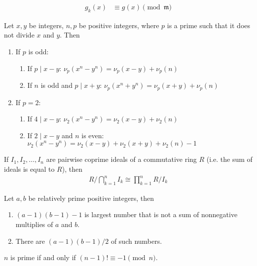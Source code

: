 \documentclass{treatise}
\begin{document}
\begin{shaded}
\begin{lemma}
\begin{align*}
g_k(x) & \equiv g(x) \pmod{\mathfrak{m}}
\end{align*}
\end{lemma}
\begin{lemma}
Let $x, y$ be integers, $n, p$ be positive integers, where $p$ is a prime such that it does not divide $x$ and $y$. Then
\begin{enumerate}
	\item If $p$ is odd:
	\begin{enumerate}
		\item If $p \mid x - y$: $\nu_p (x^n - y^n) = \nu_p (x - y) + \nu_p(n)$
		\item If $n$ is odd and $p \mid x + y$: $\nu_p (x^n + y^n) = \nu_p(x + y) + \nu_p(n)$
	\end{enumerate}
	\item If $p = 2$:
	\begin{enumerate}
		\item If $4 \mid x - y$: $\nu_2 (x^n - y^n) = \nu_2 (x - y) + \nu_2 (n)$
		\item If $2 \mid x - y$ and $n$ is even: $\nu_2 (x^n - y^n) = \nu_2 (x - y) + \nu_2 (x + y) + \nu_2 (n) - 1$
	\end{enumerate}
\end{enumerate}
\end{lemma}
\begin{theorem}
If $I_1, I_2, \hdots, I_n$ are pairwise coprime ideals of a commutative ring $R$ (i.e. the sum of ideals is equal to $R$), then
\begin{align*}
R/\bigcap_{k = 1}^n I_k \cong \prod_{k = 1}^n R/I_k
\end{align*}
\end{theorem}
\begin{theorem}
Let $a, b$ be relatively prime positive integers, then
\begin{enumerate}
	\item $(a - 1)(b - 1) - 1$ is largest number that is not a sum of nonnegative multiplies of $a$ and $b$.
	\item There are $(a - 1)(b - 1)/2$ of such numbers.
\end{enumerate}
\end{theorem}
\begin{theorem}
$n$ is prime if and only if $(n - 1)! \equiv -1 \pmod{n}$.
\end{theorem}
\begin{theorem}

\end{theorem}
\end{shaded}
\end{document}
